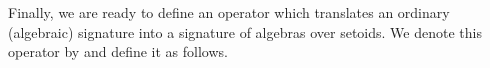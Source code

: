 Finally, we are ready to define an operator which
translates an ordinary (algebraic) signature into a signature of algebras over setoids.
\ifshort\else
We denote this operator by  and define it as follows.
\fi

\begin{code}%
\>[0]\<%
\\
\>[0]\AgdaSpace{}%
\AgdaSymbol{:}\AgdaSpace{}%
\AgdaSpace{}%
\AgdaSpace{}%
\AgdaSpace{}%
\AgdaSpace{}%
\AgdaSpace{}%
\AgdaSpace{}%
\AgdaSpace{}%
\AgdaSpace{}%
\AgdaSpace{}%
\AgdaSymbol{\AgdaUnderscore{}}\AgdaSpace{}%
\AgdaSymbol{\AgdaUnderscore{}}\<%
\\
%
\\[\AgdaEmptyExtraSkip]%
\>[0]%
\>[9]\AgdaSymbol{(}\AgdaSpace{}%
\AgdaSpace{}%
\AgdaSpace{}%
\AgdaSymbol{)}%
\>[34]\AgdaSymbol{=}\AgdaSpace{}%
\AgdaFunction{Σ[}\AgdaSpace{}%
\AgdaSpace{}%
\AgdaSpace{}%
\AgdaSpace{}%
\AgdaSpace{}%
\AgdaSpace{}%
\AgdaFunction{]}\AgdaSpace{}%
\AgdaSymbol{(}\AgdaSpace{}%
\AgdaSpace{}%
\AgdaSpace{}%
\AgdaSpace{}%
\AgdaSpace{}%
\AgdaSpace{}%
\AgdaSymbol{)}\<%
\\
\>[0]%
\>[9]\AgdaSymbol{(}\AgdaSpace{}%
\AgdaSpace{}%
\AgdaSpace{}%
\AgdaSymbol{)(}\AgdaSpace{}%
\AgdaOperator{\AgdaInductiveConstructor{,}}\AgdaSpace{}%
\AgdaSymbol{)(}\AgdaSpace{}%
\AgdaOperator{\AgdaInductiveConstructor{,}}\AgdaSpace{}%
\AgdaSymbol{)}%
\>[34]\AgdaSymbol{=}\AgdaSpace{}%
\AgdaFunction{Σ[}\AgdaSpace{}%
\AgdaSpace{}%
\AgdaSpace{}%
\AgdaSpace{}%
\AgdaSpace{}%
\AgdaSpace{}%
\AgdaFunction{]}\AgdaSpace{}%
\AgdaSymbol{\{}\AgdaSpace{}%
\AgdaSymbol{=}\AgdaSpace{}%
\AgdaSymbol{\}}\AgdaSpace{}%
\AgdaSpace{}%
\AgdaSpace{}%

\end{code}
